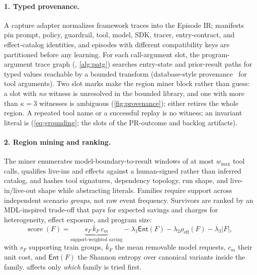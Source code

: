 \paragraph{1. Typed provenance.}
A capture adapter normalizes framework traces into the Episode IR; manifests pin
prompt, policy, guardrail, tool, model, SDK, tracer, entry-contract, and
effect-catalog identities, and episodes with different compatibility keys are
partitioned before any learning. For each call-argument slot, the
program-argument trace graph (\patg, \cref{alg:patg}) searches entry-state and
prior-result paths for typed values reachable by a bounded transform
(database-style provenance~\citep{cheney2009provenance} for tool arguments).
Two slot marks make the region miner block rather than guess:
a slot with \emph{no} witness is unresolved in the bounded library, and one with more
than $\kappa=3$ witnesses is ambiguous (\cref{fig:provenance}); either retires
the whole region. A repeated tool name or a successful replay is no witness; an
invariant literal is (\cref{eq:grounding}; the  slots of the
PR-outcome and backlog artifacts).

\paragraph{2. Region mining and ranking.}
The miner enumerates model-boundary-to-result windows of at most $w_{\max}$ tool
calls, qualifies live-ins and effects against a human-signed rather than
inferred catalog, and hashes tool signatures, dependency topology, run shape,
and live-in/live-out shape while abstracting literals. Families require support
across independent scenario \emph{groups}, not raw event frequency. Survivors are ranked by an
MDL-inspired trade-off that pays for expected savings and charges
for heterogeneity, effect exposure, and program size:
\begin{equation}
  \operatorname{score}(F)=
  \underbrace{s_F\,\bar{k}_F\,c_m}_{\text{support-weighted saving}}
  -\lambda_1 \mathsf{Ent}(F)-\lambda_2\rho_{\mathrm{eff}}(F)-\lambda_3|F| ,
  \label{eq:score}
\end{equation}
with $s_F$ supporting train groups, $\bar{k}_F$ the mean removable model requests,
$c_m$ their unit cost, and $\mathsf{Ent}(F)$ the Shannon entropy over canonical
variants inside the family.  affects only \emph{which} family is
tried first.


